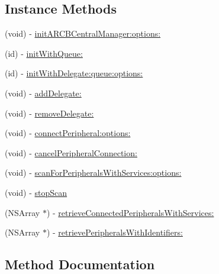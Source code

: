 \subsection*{Instance Methods}
\begin{DoxyCompactItemize}
\item 
(void) -\/ \hyperlink{interfaceARSAL__CentralManager_a33777e4ba7350c283985eb1543f66618}{init\+A\+R\+C\+B\+Central\+Manager\+:options\+:}
\item 
(id) -\/ \hyperlink{interfaceARSAL__CentralManager_a5f8453573494c372cf620f45a77aa3d4}{init\+With\+Queue\+:}
\item 
(id) -\/ \hyperlink{interfaceARSAL__CentralManager_a210798b430593e8dda10b720d05d0804}{init\+With\+Delegate\+:queue\+:options\+:}
\item 
(void) -\/ \hyperlink{interfaceARSAL__CentralManager_aa5f722e581a7b704675dacdca5f9bd5e}{add\+Delegate\+:}
\item 
(void) -\/ \hyperlink{interfaceARSAL__CentralManager_a8cf717c255f5228ced0c72c3b0c20ff9}{remove\+Delegate\+:}
\item 
(void) -\/ \hyperlink{interfaceARSAL__CentralManager_a4902ef59666d20f7964179a184435be8}{connect\+Peripheral\+:options\+:}
\item 
(void) -\/ \hyperlink{interfaceARSAL__CentralManager_a9e0a82a9de4683aab71c38aade16a2c2}{cancel\+Peripheral\+Connection\+:}
\item 
(void) -\/ \hyperlink{interfaceARSAL__CentralManager_a2db3036b3d65aee5d4d5c971685142ef}{scan\+For\+Peripherals\+With\+Services\+:options\+:}
\item 
(void) -\/ \hyperlink{interfaceARSAL__CentralManager_af249376b57f0da90f621e2218c649aa5}{stop\+Scan}
\item 
(N\+S\+Array $\ast$) -\/ \hyperlink{interfaceARSAL__CentralManager_ae7e88c2aefe924068d9930e560716559}{retrieve\+Connected\+Peripherals\+With\+Services\+:}
\item 
(N\+S\+Array $\ast$) -\/ \hyperlink{interfaceARSAL__CentralManager_a75908f30d71bc7cae87dbfdac97d1396}{retrieve\+Peripherals\+With\+Identifiers\+:}
\end{DoxyCompactItemize}


\subsection{Method Documentation}
\hypertarget{interfaceARSAL__CentralManager_aa5f722e581a7b704675dacdca5f9bd5e}{}\label{interfaceARSAL__CentralManager_aa5f722e581a7b704675dacdca5f9bd5e} 
